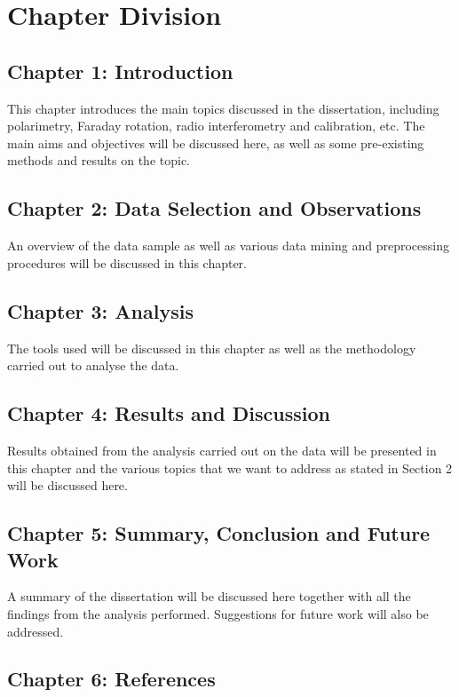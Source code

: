 \documentclass[a4paper,12pt,notitlepage]{article}
\begin{document}
\section{Chapter Division}

\subsection{Chapter 1: Introduction}

This chapter introduces the main topics discussed in the dissertation, including polarimetry, Faraday rotation, radio interferometry and calibration, etc. The main aims and objectives will be discussed here, as well as some pre-existing methods and results on the topic. 

\subsection{Chapter 2: Data Selection and Observations}

An overview of the data sample as well as various data mining and preprocessing
procedures will be discussed in this chapter.

\subsection{Chapter 3: Analysis}

The tools used will be discussed in this chapter as well as the methodology carried
out to analyse the data.

\subsection{Chapter 4: Results and Discussion}

Results obtained from the analysis carried out on the data will be presented in this
chapter and the various topics that we want to address as stated in Section 2 will be
discussed here.

\subsection{Chapter 5: Summary, Conclusion and Future Work}

A summary of the dissertation will be discussed here together with all the findings
from the analysis performed. Suggestions for future work will also be
addressed.

\subsection{Chapter 6: References}
\end{document}
